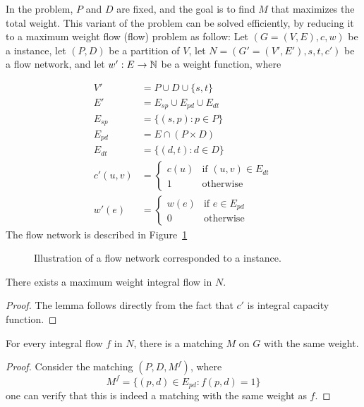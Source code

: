 \label{sub:fixed}
In the \textsc{\FIXEDCARPOOL{}} problem, $P$ and $D$ are fixed, 
and the goal is to find $M$ that maximizes the total weight. 
This variant of the problem can be solved efficiently,
by reducing it to a maximum weight flow (flow) problem as
follow:
Let $(G = (V, E), c, w)$ be a \CARPOOL{} instance,
let $(P, D)$ be a partition of $V$,
let  $N = (G' = (V', E'), s, t, c')$ be a flow network, 
and let $w' : E \rightarrow \mathbb{N}$ be a weight function, where 

\begin{align*}
V'			& = P \cup D \cup \{s, t\}										\\
E'			& = E_{sp} \cup E_{pd} \cup E_{dt}								\\
E_{sp}		& =	\{(s, p) : p \in P \}										\\
E_{pd}		& =	E \cap (P \times D)											\\
E_{dt}		& =	\{(d, t) : d \in D \}										\\
c'(u, v)	& = 
				\begin{cases}
				c(u) & \text{if } (u, v) \in E_{dt} 						\\
				1 & \text{otherwise}
				\end{cases}
																			\\
w'(e)			& = 
				\begin{cases}
				w(e) & \text{if } e \in E_{pd} 								\\
				0 & \text{otherwise}	
				\end{cases}
\end{align*}
The flow network is described in Figure~\ref{fig:flow}
\begin{figure}
\centering

\caption{
\label{fig:flow}
Illustration of a flow network corresponded to a \FIXEDCARPOOL{} instance.}
\end{figure}

\begin{lemma}
There exists a maximum weight integral flow in $N$.
\end{lemma}

\begin{proof}
The lemma follows directly from the fact that $c'$ is integral capacity function.
\end{proof}

\begin{lemma}
For every integral flow $f$ in $N$, there is a matching $M$ on $G$ with the same weight. 
\end{lemma}

\begin{proof}
Consider the matching $(P, D, M^f)$, where 
$$ M^f = \{(p, d) \in E_{pd} : f(p, d) = 1\} $$
one can verify that this is indeed a matching with the same weight as $f$.
\end{proof}

